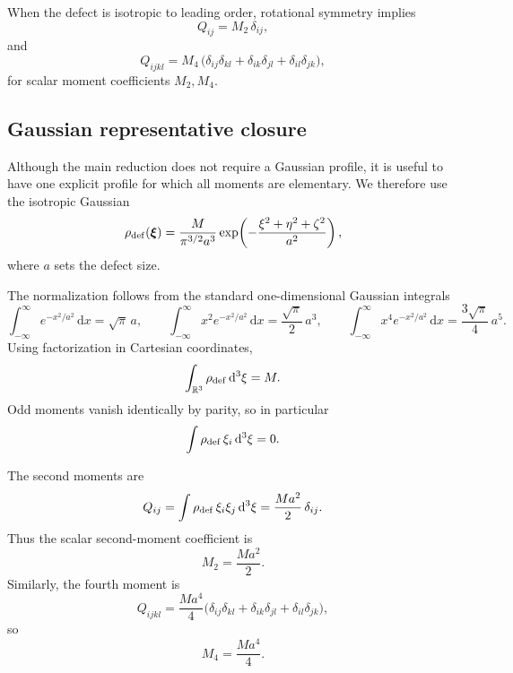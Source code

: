 \documentclass[11pt]{article}
\newcommand{\dd}{\mathrm d}
\begin{document}
When the defect is isotropic to leading order, rotational symmetry implies
\begin{equation}
Q_{ij}=M_2\,\delta_{ij},
\label{eq:app-Qij-isotropic}
\end{equation}
and
\begin{equation}
Q_{ijkl}
=
M_4\,
\bigl(
\delta_{ij}\delta_{kl}
+
\delta_{ik}\delta_{jl}
+
\delta_{il}\delta_{jk}
\bigr),
\label{eq:app-Qijkl-isotropic}
\end{equation}
for scalar moment coefficients \(M_2,M_4\).

\subsection{Gaussian representative closure}
\label{app:moments-gaussian}

Although the main reduction does not require a Gaussian profile, it is useful to have one
explicit profile for which all moments are elementary. We therefore use the isotropic
Gaussian
\begin{equation}
\rho_{\rm def}(\boldsymbol{\xi})
=
\frac{M}{\pi^{3/2}a^3}
\exp\!\left(-\frac{\xi^2+\eta^2+\zeta^2}{a^2}\right),
\label{eq:app-gaussian-profile}
\end{equation}
where \(a\) sets the defect size.

The normalization follows from the standard one-dimensional Gaussian integrals
\begin{equation}
\int_{-\infty}^{\infty}e^{-x^2/a^2}\,\dd x=\sqrt{\pi}\,a,
\qquad
\int_{-\infty}^{\infty}x^2 e^{-x^2/a^2}\,\dd x=\frac{\sqrt{\pi}}{2}\,a^3,
\qquad
\int_{-\infty}^{\infty}x^4 e^{-x^2/a^2}\,\dd x=\frac{3\sqrt{\pi}}{4}\,a^5.
\label{eq:app-gaussian-1d}
\end{equation}
Using factorization in Cartesian coordinates,
\begin{equation}
\int_{\mathbb R^3}\rho_{\rm def}\,\dd^3\xi=M.
\label{eq:app-gaussian-normalized}
\end{equation}
Odd moments vanish identically by parity, so in particular
\begin{equation}
\int \rho_{\rm def}\,\xi_i\,\dd^3\xi=0.
\label{eq:app-gaussian-dipole}
\end{equation}

The second moments are
\begin{equation}
Q_{ij}
=
\int \rho_{\rm def}\,\xi_i\xi_j\,\dd^3\xi
=
\frac{Ma^2}{2}\,\delta_{ij}.
\label{eq:app-gaussian-Qij}
\end{equation}
Thus the scalar second-moment coefficient is
\begin{equation}
M_2=\frac{Ma^2}{2}.
\label{eq:app-M2}
\end{equation}
Similarly, the fourth moment is
\begin{equation}
Q_{ijkl}
=
\frac{Ma^4}{4}
\bigl(
\delta_{ij}\delta_{kl}
+
\delta_{ik}\delta_{jl}
+
\delta_{il}\delta_{jk}
\bigr),
\label{eq:app-gaussian-Qijkl}
\end{equation}
so
\begin{equation}
M_4=\frac{Ma^4}{4}.
\label{eq:app-M4}
\end{equation}
\end{document}
